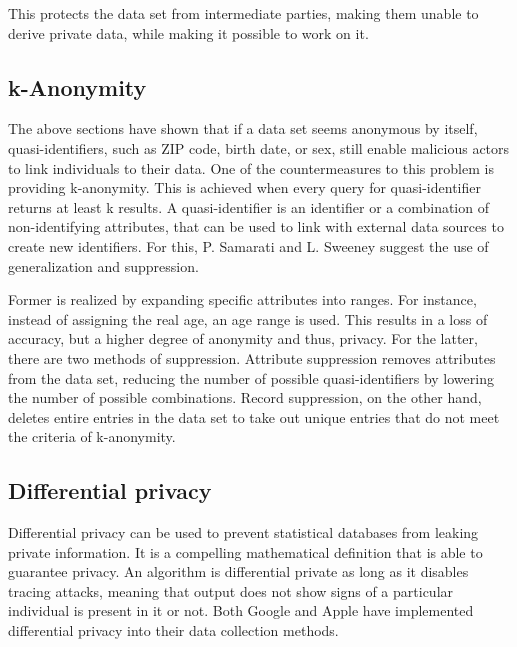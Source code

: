 This protects the data set from intermediate parties, making them unable to derive private data, while making it possible to work on it.

\subsection{k-Anonymity}
The above sections have shown that if a data set seems anonymous by itself, quasi-identifiers, such as ZIP code, birth date, or sex, still enable malicious actors to link individuals to their data. One of the countermeasures to this problem is providing k-anonymity. This is achieved when every query for quasi-identifier returns at least k results. A quasi-identifier is an identifier or a combination of non-identifying attributes, that can be used to link with external data sources to create new identifiers. For this, P. Samarati and L. Sweeney suggest the use of generalization and suppression.

Former is realized by expanding specific attributes into ranges. For instance, instead of assigning the real age, an age range is used. This results in a loss of accuracy, but a higher degree of anonymity and thus, privacy. For the latter, there are two methods of suppression. Attribute suppression removes attributes from the data set, reducing the number of possible quasi-identifiers by lowering the number of possible combinations. Record suppression, on the other hand, deletes entire entries in the data set to take out unique entries that do not meet the criteria of k-anonymity.

\subsection{Differential privacy}
Differential privacy can be used to prevent statistical databases from leaking private information. It is a compelling mathematical definition that is able to guarantee privacy. An algorithm is differential private as long as it disables tracing attacks, meaning that output does not show signs of a particular individual is present in it or not.
Both Google and Apple have implemented differential privacy into their data collection methods.

